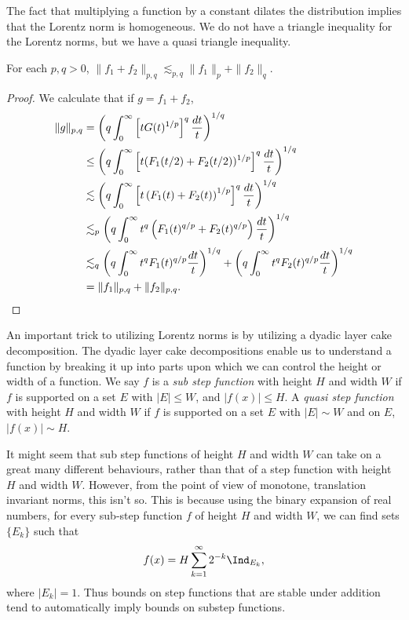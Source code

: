 The fact that multiplying a function by a constant dilates the distribution implies that the Lorentz norm is homogeneous. We do not have a triangle inequality for the Lorentz norms, but we have a quasi triangle inequality.

\begin{theorem}
	For each $p,q > 0$, $\| f_1 + f_2 \|_{p,q} \lesssim_{p,q} \| f_1 \|_p + \| f_2 \|_q$.
\end{theorem}
\begin{proof}
    We calculate that if $g = f_1 + f_2$,
    \begin{align*}
    \| g \|_{p,q} &= \left( q \int_0^\infty \left[t G(t)^{1/p} \right]^q \frac{dt}{t} \right)^{1/q}\\
    &\leq \left( q \int_0^\infty \left[ t (F_1(t/2) + F_2(t/2))^{1/p} \right]^q \frac{dt}{t} \right)^{1/q}\\
    &\lesssim \left( q \int_0^\infty \left[ t \left( F_1(t) + F_2(t) \right)^{1/p} \right]^q \frac{dt}{t} \right)^{1/q}\\
    &\lesssim_p \left( q \int_0^\infty t^q \left( F_1(t)^{q/p} + F_2(t)^{q/p} \right) \frac{dt}{t} \right)^{1/q}\\
    &\lesssim_q  \left( q \int_0^\infty t^q F_1(t)^{q/p} \frac{dt}{t} \right)^{1/q} +  \left( q \int_0^\infty t^q F_2(t)^{q/p} \frac{dt}{t} \right)^{1/q}\\
    &= \| f_1 \|_{p,q} + \| f_2 \|_{p,q}. \qedhere
  \end{align*}
\end{proof}

An important trick to utilizing Lorentz norms is by utilizing a dyadic layer cake decomposition. The dyadic layer cake decompositions enable us to understand a function by breaking it up into parts upon which we can control the height or width of a function. We say $f$ is a \emph{sub step function} with height $H$ and width $W$ if $f$ is supported on a set $E$ with $|E| \leq W$, and $|f(x)| \leq H$. A \emph{quasi step function} with height $H$ and width $W$ if $f$ is supported on a set $E$ with $|E| \sim W$ and on $E$, $|f(x)| \sim H$.

\begin{remark}
  It might seem that sub step functions of height $H$ and width $W$ can take on a great many different behaviours, rather than that of a step function with height $H$ and width $W$. However, from the point of view of monotone, translation invariant norms, this isn't so. This is because using the binary expansion of real numbers, for every sub-step function $f$ of height $H$ and width $W$, we can find sets $\{ E_k \}$ such that
  \[ f(x) = H \sum_{k = 1}^\infty 2^{-k} \Ind_{E_k}, \]
  where $|E_k| = 1$. Thus bounds on step functions that are stable under addition tend to automatically imply bounds on substep functions.
\end{remark}

